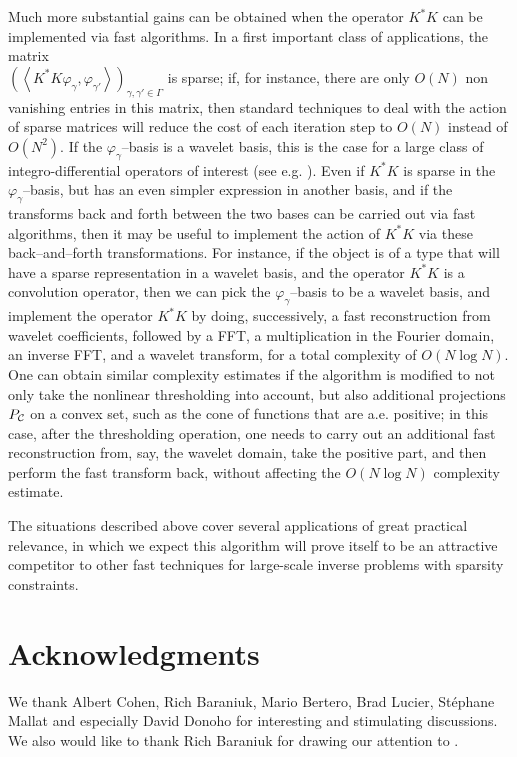 \documentclass[10pt]{article}
\def\K{K^*}
\def\vpg{\varphi_{\gamma}}
\begin{document}
Much more substantial gains can be obtained when the operator $\K K$ can be
implemented via fast algorithms. In a first important class of applications,
the matrix \\
$\left( \left<\K K\varphi_{\gamma},\varphi_{\gamma'}\right> \right)_
{\gamma , \gamma' \in \Gamma}$ is sparse; if, for instance, there are only
$O(N)$ non vanishing entries in this matrix, then standard techniques to deal
with the action of sparse matrices will reduce the cost of each iteration step
to $O(N)$ instead of $O(N^2)$. If the $\vpg$--basis
is a wavelet basis, this is the case for a large class
of integro-differential operators of interest (see e.g. \cite{Bey91}).
Even if $\K K$ is sparse in the $\vpg$--basis, but has an even simpler
expression in another basis, and if the transforms back and forth between the
two bases can be carried out via fast algorithms, then it may be useful to
implement the action of $\K K$ via these back--and--forth transformations.
For instance, if the object is of a type that will have a sparse representation
in a wavelet basis, and the operator $\K K$ is a convolution operator, then
we can pick the $\vpg$--basis to be a wavelet basis, and implement the
operator $\K K$ by doing, successively, a fast reconstruction from wavelet
coefficients, followed by a FFT, a multiplication in the Fourier domain, an
inverse FFT, and a wavelet transform, for a total complexity of $O(N \log N)$.
One can obtain similar complexity estimates if the algorithm is modified
to not only take the nonlinear thresholding into account, but also additional
projections $P_{\cal C}$ on a convex set, such as the cone of functions that
are a.e. positive; in this case, after the thresholding operation, one needs
to carry out an additional fast reconstruction from, say, the wavelet domain,
take the positive part, and then perform the fast transform back, without
affecting the $O(N \log N)$ complexity estimate.

The situations described above cover several applications of
great practical relevance, in which we expect this algorithm will prove itself
to be an attractive competitor to other fast techniques for large-scale
inverse problems with sparsity constraints.




\section*{Acknowledgments}

We thank Albert Cohen, Rich Baraniuk, Mario Bertero, Brad Lucier,
St\'ephane Mallat
and especially David Donoho for interesting and stimulating discussions. We
also
would like to thank Rich Baraniuk for drawing our attention to \cite{Fig03}.
\end{document}
